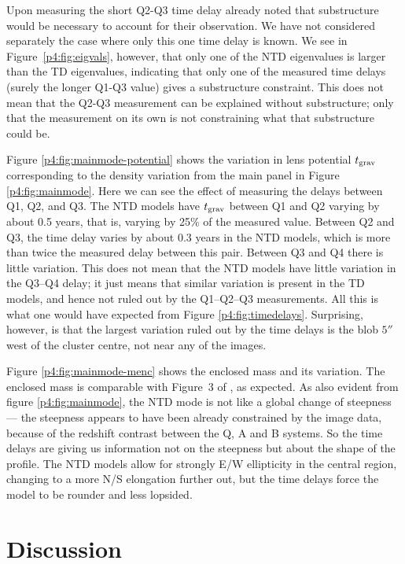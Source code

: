 \documentclass[
  11pt,
  twoside,
  openright,
  titlepage,
  headings=optiontoheadandtoc
]{scrbook}
\begin{document}
Upon measuring the short Q2-Q3 time delay \cite{2007ApJ...662...62F}
already noted that substructure would be necessary to account for
their observation.  We have not considered separately the case where
only this one time delay is known.  We see in
Figure~\ref{p4:fig:eigvals}, however, that only one of the NTD
eigenvalues is larger than the TD eigenvalues, indicating that only
one of the measured time delays (surely the longer Q1-Q3 value) gives
a substructure constraint.  This does not mean that the Q2-Q3
measurement can be explained without substructure; only that the
measurement on its own is not constraining what that substructure
could be.

Figure \ref{p4:fig:mainmode-potential} shows the variation in lens
potential $t_{\rm grav}$ corresponding to the density variation from
the main panel in Figure \ref{p4:fig:mainmode}.  Here we can see the
effect of measuring the delays between Q1, Q2, and Q3.  The NTD models
have $t_{\rm grav}$ between Q1 and Q2 varying by about 0.5 years, that
is, varying by 25\% of the measured value.  Between Q2 and Q3, the
time delay varies by about 0.3 years in the NTD models, which is more
than twice the measured delay between this pair.  Between Q3 and Q4
there is little variation.  This does not mean that the NTD models
have little variation in the Q3--Q4 delay; it just means that similar
variation is present in the TD models, and hence not ruled out by the
Q1--Q2--Q3 measurements.  All this is what one would have expected
from Figure \ref{p4:fig:timedelays}.  Surprising, however, is that the
largest variation ruled out by the time delays is the blob $5''$ west
of the cluster centre, not near any of the images.

Figure \ref{p4:fig:mainmode-menc} shows the enclosed mass and its
variation.  The enclosed mass is comparable with Figure~3 of
\cite{2010PASJ...62.1017O}, as expected.  As also evident from figure
\ref{p4:fig:mainmode}, the NTD mode is not like a global change of steepness --- the
steepness appears to have been already constrained by the image data,
because of the redshift contrast between the Q, A and B systems.  So
the time delays are giving us information not on the steepness but
about the shape of the profile.  The NTD models allow for strongly E/W
ellipticity in the central region, changing to a more N/S elongation
further out, but the time delays force the model to be rounder and
less lopsided.

\section{Discussion}
\end{document}
